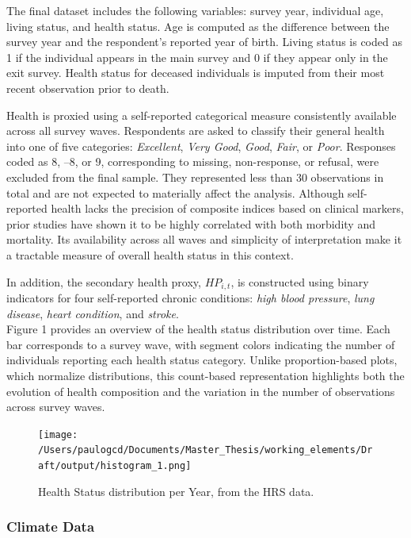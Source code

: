 \documentclass{article}
\begin{document}
The final dataset includes the following variables: survey year, individual age, living status, and health status.
Age is computed as the difference between the survey year and the respondent’s reported year of birth.
Living status is coded as 1 if the individual appears in the main survey and 0 if they appear only in the exit survey.
Health status for deceased individuals is imputed from their most recent observation prior to death.

Health is proxied using a self-reported categorical measure consistently
available across all survey waves. Respondents are asked to classify their
general health into one of five categories: \textit{Excellent}, \textit{Very Good},
\textit{Good}, \textit{Fair}, or \textit{Poor}.
Responses coded as 8, –8, or 9, corresponding to missing, non-response, or refusal, 
were excluded from the final sample.
They represented less than 30 observations in total and are not expected to materially affect the analysis.
Although self-reported health lacks the precision of composite indices based on clinical markers,
prior studies have shown it to be highly correlated with both morbidity and mortality.
Its availability across all waves and simplicity of interpretation make
it a tractable measure of overall health status in this context.

In addition, the secondary health proxy, $HP_{i,t}$, is constructed using
binary indicators for four self-reported chronic conditions: \textit{high blood pressure},
\textit{lung disease}, \textit{heart condition}, and \textit{stroke}.
\\ 

Figure 1 provides an overview of the health status distribution over time.
Each bar corresponds to a survey wave, with segment colors indicating the number of individuals reporting each health status category.
Unlike proportion-based plots, which normalize distributions, this count-based representation highlights both the evolution of health composition and the variation in the number of observations across survey waves.


\begin{figure}[H]
    \texttt{[image: /Users/paulogcd/Documents/Master\_Thesis/working\_elements/Draft/output/histogram\_1.png]}
    \caption{Health Status distribution per Year, from the HRS data.}
\end{figure}

\subsubsection{Climate Data}
\end{document}
